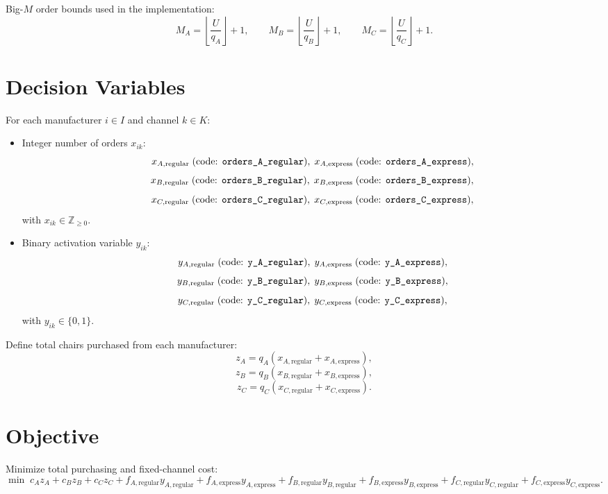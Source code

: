 Big-$M$ order bounds used in the implementation:
\[
M_A=\left\lfloor \frac{U}{q_A}\right\rfloor + 1,\qquad
M_B=\left\lfloor \frac{U}{q_B}\right\rfloor + 1,\qquad
M_C=\left\lfloor \frac{U}{q_C}\right\rfloor + 1.
\]

\section*{Decision Variables}

For each manufacturer $i\in I$ and channel $k\in K$:
\begin{itemize}
    \item Integer number of orders $x_{ik}$:
    \[
    x_{A,\mathrm{regular}} \;(\text{code: \texttt{orders\_A\_regular}}),\;
    x_{A,\mathrm{express}} \;(\text{code: \texttt{orders\_A\_express}}),
    \]
    \[
    x_{B,\mathrm{regular}} \;(\text{code: \texttt{orders\_B\_regular}}),\;
    x_{B,\mathrm{express}} \;(\text{code: \texttt{orders\_B\_express}}),
    \]
    \[
    x_{C,\mathrm{regular}} \;(\text{code: \texttt{orders\_C\_regular}}),\;
    x_{C,\mathrm{express}} \;(\text{code: \texttt{orders\_C\_express}}),
    \]
    with $x_{ik}\in \mathbb{Z}_{\ge 0}$.
    \item Binary activation variable $y_{ik}$:
    \[
    y_{A,\mathrm{regular}} \;(\text{code: \texttt{y\_A\_regular}}),\;
    y_{A,\mathrm{express}} \;(\text{code: \texttt{y\_A\_express}}),
    \]
    \[
    y_{B,\mathrm{regular}} \;(\text{code: \texttt{y\_B\_regular}}),\;
    y_{B,\mathrm{express}} \;(\text{code: \texttt{y\_B\_express}}),
    \]
    \[
    y_{C,\mathrm{regular}} \;(\text{code: \texttt{y\_C\_regular}}),\;
    y_{C,\mathrm{express}} \;(\text{code: \texttt{y\_C\_express}}),
    \]
    with $y_{ik}\in \{0,1\}$.
\end{itemize}

Define total chairs purchased from each manufacturer:
\[
z_A = q_A(x_{A,\mathrm{regular}}+x_{A,\mathrm{express}}),
\]
\[
z_B = q_B(x_{B,\mathrm{regular}}+x_{B,\mathrm{express}}),
\]
\[
z_C = q_C(x_{C,\mathrm{regular}}+x_{C,\mathrm{express}}).
\]

\section*{Objective}

Minimize total purchasing and fixed-channel cost:
\[
\min\;
c_A z_A + c_B z_B + c_C z_C
+ f_{A,\mathrm{regular}}y_{A,\mathrm{regular}} + f_{A,\mathrm{express}}y_{A,\mathrm{express}}
+ f_{B,\mathrm{regular}}y_{B,\mathrm{regular}} + f_{B,\mathrm{express}}y_{B,\mathrm{express}}
+ f_{C,\mathrm{regular}}y_{C,\mathrm{regular}} + f_{C,\mathrm{express}}y_{C,\mathrm{express}}.
\]

